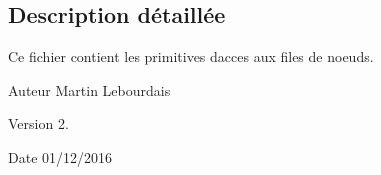\subsection{Description détaillée}
Ce fichier contient les primitives d\textquotesingle{}acces aux files de noeuds. 

\begin{DoxyAuthor}{Auteur}
Martin Lebourdais 
\end{DoxyAuthor}
\begin{DoxyVersion}{Version}
2. 
\end{DoxyVersion}
\begin{DoxyDate}{Date}
01/12/2016 
\end{DoxyDate}
